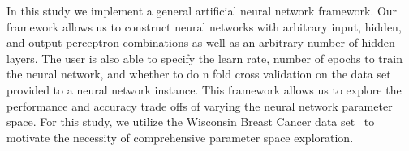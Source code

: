 In this study we implement a general artificial neural network framework.
Our framework allows us to construct neural networks with arbitrary input, hidden, and output perceptron combinations as well as an arbitrary number of hidden layers.
The user is also able to specify the learn rate, number of epochs to train the neural network, and whether to do n fold cross validation on the data set provided to a neural network instance.
This framework allows us to explore the performance and accuracy trade offs of varying the neural network parameter space.
For this study, we utilize the Wisconsin Breast Cancer data set~\cite{wolberg1990multisurface} to motivate the necessity of comprehensive parameter space exploration.
